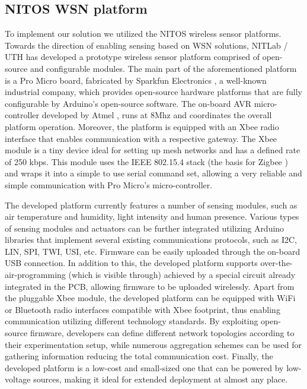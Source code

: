\documentclass[conference]{IEEEtran}
\begin{document}
\subsection{NITOS WSN platform}
To implement our solution we utilized the NITOS wireless sensor platforms. 
Towards the direction of enabling sensing based on WSN solutions, NITLab \cite{nitlab} / UTH has developed a prototype wireless sensor platform comprised of open-source and configurable modules. 
The main part of the aforementioned platform is a Pro Micro \cite{promicro} board, fabricated by Sparkfun Electronics \cite{sparkfun}, a well-known industrial company, which provides open-source hardware platforms that are fully configurable by Arduino's \cite{arduino} open-source software. 
The on-board AVR micro-controller developed by Atmel \cite{atmel}, runs at 8Mhz and coordinates the overall platform operation. 
Moreover, the platform is equipped with an Xbee \cite{xbee} radio interface that enables communication with a respective gateway. 
The Xbee module is a tiny device ideal for setting up mesh networks and has a defined rate of 250 kbps. 
This module uses the IEEE 802.15.4 stack (the basis for Zigbee \cite{zigbee-all}) and wraps it into a simple to use serial command set, allowing a very reliable and simple communication with Pro Micro's micro-controller. 


The developed platform currently features a number of sensing modules, such as air temperature and humidity, light intensity and human presence. 
Various types of sensing modules and actuators can be further integrated utilizing Arduino libraries that implement several existing communications protocols, such as I2C, LIN, SPI, TWI, USI, etc. 
Firmware can be easily uploaded through the on-board USB connection. 
In addition to this, the developed platform supports over-the-air-programming (which is visible through) achieved by a special circuit already integrated in the PCB, allowing firmware to be uploaded wirelessly. 
Apart from the pluggable Xbee module, the developed platform can be equipped with WiFi or Bluetooth radio interfaces compatible with Xbee footprint, thus enabling communication utilizing different technology standards. 
By exploiting open-source firmware, developers can define different network topologies according to their experimentation setup, while numerous aggregation schemes can be used for gathering information reducing the total communication cost. 
Finally, the developed platform is a low-cost and small-sized one that can be powered by low-voltage sources, making it ideal for extended deployment at almost any place.
\end{document}

